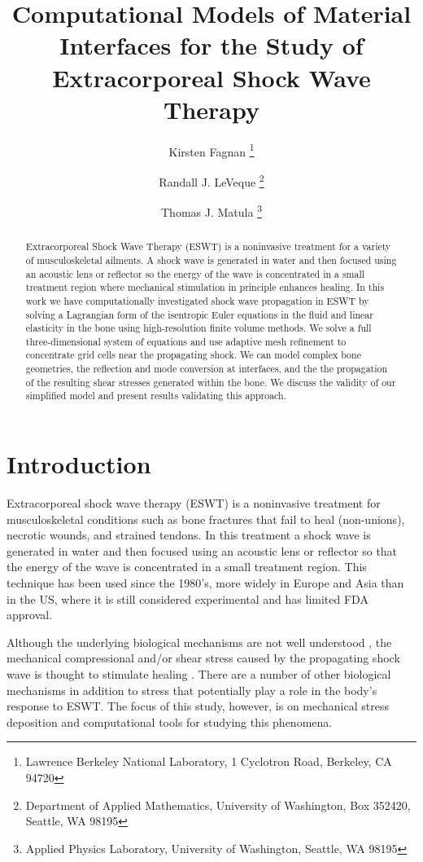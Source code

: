 \documentclass{article}
\title{Computational Models of Material Interfaces for the Study of 
Extracorporeal Shock Wave Therapy}
\author{Kirsten Fagnan \thanks{Lawrence Berkeley National Laboratory, 1 Cyclotron Road, Berkeley, 
CA 94720} \and Randall J. LeVeque \thanks{Department of Applied Mathematics, University of 
Washington, Box 352420, Seattle, WA 98195} \and Thomas J. Matula \thanks{Applied Physics 
Laboratory, University of Washington, Seattle, WA 98195}}
\begin{document}
\maketitle

\begin{abstract}
Extracorporeal Shock Wave Therapy (ESWT) is a noninvasive treatment
for a variety of musculoskeletal ailments.
A shock wave is generated in water
and then focused using an acoustic lens or reflector so the energy of
the wave is concentrated in a small treatment region where mechanical stimulation in principle
enhances healing.
In this work we have computationally
investigated shock wave propagation in ESWT by solving a Lagrangian
form of the isentropic Euler equations in the fluid and linear
elasticity in the bone using high-resolution finite volume methods.
We solve a full three-dimensional system of equations and use adaptive mesh
refinement to concentrate grid cells near the propagating shock.  
We can model complex bone
geometries, the reflection and mode conversion at interfaces, and the
the propagation of the resulting
shear stresses generated within the bone.   We discuss the validity of our
simplified model and present results validating this approach. 
\end{abstract}

\pagestyle{myheadings}
\thispagestyle{plain}


\section{Introduction}\label{sec:intro}
Extracorporeal shock wave therapy (ESWT) is a noninvasive treatment
for musculoskeletal conditions such as bone fractures
that fail to heal (non-unions), necrotic wounds, and strained
tendons\cite{cjwang_hip,eswt_shoulder}.  In this treatment a shock wave is generated in water and
then focused using an acoustic lens or reflector so that the energy
of the wave is concentrated in a small treatment region.  This
technique has been used since the 1980's, more widely in Europe and
Asia than in the US, where it is still considered experimental and
has limited FDA approval.  

Although the underlying biological
mechanisms are not well understood \cite{ogden}, the mechanical
compressional and/or shear
stress caused by the propagating shock wave is thought to
stimulate healing \cite{ogden,eswt_vegf,huang2010, morgan2008, turner1998, park1998,prendergast1997,lacroix2002,claes1999,isaksson2006,carter1998,goodship1985}.    
There are a number of other biological mechanisms in addition to stress that
potentially play a role in the body's response to ESWT. The focus of this
study, however, is on mechanical stress deposition and computational tools
for studying this phenomena.
\end{document}
